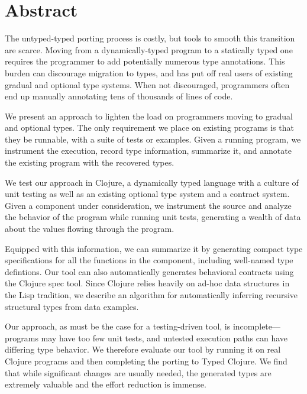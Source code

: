\chapter{Abstract}

  The untyped-typed porting process is costly, but tools to smooth
  this transition are scarce.  Moving from a dynamically-typed program
  to a statically typed one requires the programmer to add potentially
  numerous type annotations. This burden can discourage migration to
  types, and has put off real users of existing gradual and optional
  type systems. When not discouraged, programmers often end up
  manually annotating tens of thousands of lines of code.

We present an approach to lighten the load on programmers moving to
gradual and optional types. The only requirement we place on existing
programs is that they be runnable, with a suite of tests or
examples. Given a running program, we instrument the execution, record
type information, summarize it, and annotate the existing program with
the recovered types.

We test our approach in Clojure, a dynamically typed
language with a culture of unit testing as well as an  existing
optional type system and a contract system. Given a component under
consideration, we instrument the source and analyze the behavior of the
program while running unit tests, generating a wealth of data about
the values flowing through the program.

Equipped with this information, we can summarize it by generating compact
type specifications for all the functions in the component, including
well-named type defintions. Our tool can also automatically generates
behavioral contracts using the Clojure spec tool. Since Clojure relies
heavily on ad-hoc data structures in the Lisp tradition, we describe
an algorithm for automatically inferring recursive structural types
from data examples.

Our approach, as must be the case for a testing-driven tool, is
incomplete---programs may have too few unit tests, and untested
execution paths can have differing type behavior. We therefore
evaluate our tool by running it on real Clojure programs and then
completing the porting to Typed Clojure. We find that while
significant changes are usually needed, the generated types are
extremely valuable and the effort reduction is immense.

